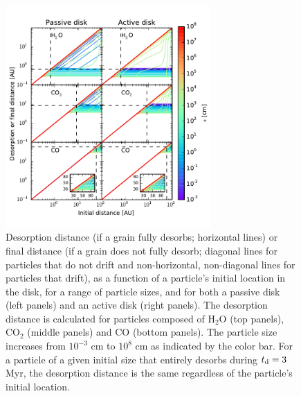 \documentclass[apj]{emulateapj}
\begin{document}
\begin{figure}[tb]
\centering
\includegraphics[width=0.7\textwidth]{desorption_distance_passive_active_colorbar_test2.pdf}
\caption{Desorption distance (if a grain fully desorbs; horizontal lines) or final distance (if a grain does not fully desorb; diagonal lines for particles that do not drift and non-horizontal, non-diagonal lines for particles that drift), as a function of a particle's initial location in the disk, for a range of particle sizes, and for both a passive disk (left panels) and an active disk (right panels). The desorption distance is calculated for particles composed of H$_2$O (top panels), CO$_2$ (middle panels) and CO (bottom panels). The particle size increases from $10^{-3}$ cm to $10^8$ cm as indicated by the color bar. For a particle of a given initial size that entirely desorbs during $t_{\rm d}=3$ Myr, the desorption distance is the same regardless of the particle's initial location.} 
\label{fig:snowlines}
\end{figure}
\end{document}

